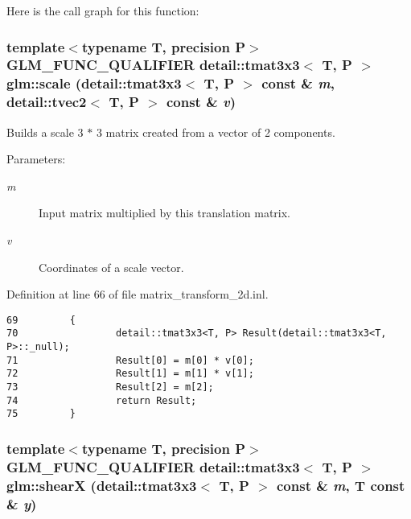 Here is the call graph for this function:\hypertarget{group__gtx__matrix__transform__2d_g275b188a11797f386aeda153a17afcdc}{
\subsubsection[scale]{\setlength{\rightskip}{0pt plus 5cm}template$<$typename T, precision P$>$ GLM\_\-FUNC\_\-QUALIFIER detail::tmat3x3$<$ T, P $>$ glm::scale (detail::tmat3x3$<$ T, P $>$ const \& {\em m}, \/  detail::tvec2$<$ T, P $>$ const \& {\em v})}}
\label{group__gtx__matrix__transform__2d_g275b188a11797f386aeda153a17afcdc}


Builds a scale 3 $\ast$ 3 matrix created from a vector of 2 components.

\begin{Desc}
\item[Parameters:]
\begin{description}
\item[{\em m}]Input matrix multiplied by this translation matrix. \item[{\em v}]Coordinates of a scale vector. \end{description}
\end{Desc}


Definition at line 66 of file matrix\_\-transform\_\-2d.inl.

\begin{Code}\begin{verbatim}69         {
70                 detail::tmat3x3<T, P> Result(detail::tmat3x3<T, P>::_null);
71                 Result[0] = m[0] * v[0];
72                 Result[1] = m[1] * v[1];
73                 Result[2] = m[2];
74                 return Result;
75         }
\end{verbatim}
\end{Code}


\hypertarget{group__gtx__matrix__transform__2d_g921a7ae4b10ba6cc7422be200cf3afd5}{
\subsubsection[shearX]{\setlength{\rightskip}{0pt plus 5cm}template$<$typename T, precision P$>$ GLM\_\-FUNC\_\-QUALIFIER detail::tmat3x3$<$ T, P $>$ glm::shearX (detail::tmat3x3$<$ T, P $>$ const \& {\em m}, \/  T const \& {\em y})}}
\label{group__gtx__matrix__transform__2d_g921a7ae4b10ba6cc7422be200cf3afd5}



